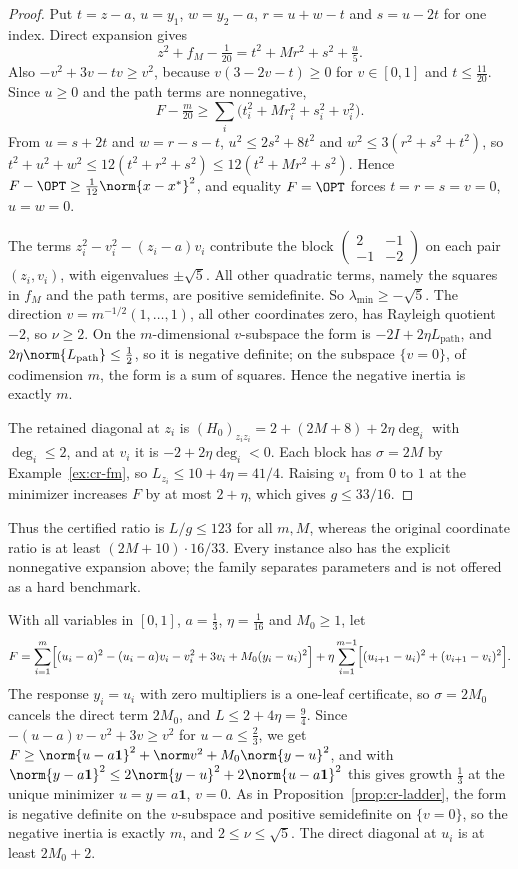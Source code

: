 \begin{proof}
Put $t=z-a$, $u=y_1$, $w=y_2-a$, $r=u+w-t$ and $s=u-2t$ for one index. Direct
expansion gives
\[
z^2+f_M-\tfrac1{20}=t^2+Mr^2+s^2+\tfrac u5.
\]
Also $-v^2+3v-tv\ge v^2$, because $v(3-2v-t)\ge0$ for $v\in[0,1]$ and
$t\le\frac{11}{20}$. Since $u\ge0$ and the path terms are nonnegative,
\[
F-\tfrac m{20}\ge\sum_i\bigl(t_i^2+Mr_i^2+s_i^2+v_i^2\bigr).
\]
From $u=s+2t$ and $w=r-s-t$, $u^2\le2s^2+8t^2$ and $w^2\le3(r^2+s^2+t^2)$, so
$t^2+u^2+w^2\le12(t^2+r^2+s^2)\le12(t^2+Mr^2+s^2)$. Hence
$F-\OPT\ge\frac1{12}\norm{x-x^*}^2$, and equality $F=\OPT$ forces
$t=r=s=v=0$, $u=w=0$.

The terms $z_i^2-v_i^2-(z_i-a)v_i$ contribute the block
$\left(\begin{smallmatrix}2&-1\\-1&-2\end{smallmatrix}\right)$ on each pair
$(z_i,v_i)$, with eigenvalues $\pm\sqrt5$. All other quadratic terms, namely
the squares in $f_M$ and the path terms, are positive semidefinite. So
$\lambda_{\min}\ge-\sqrt5$. The direction $v=m^{-1/2}(1,\ldots,1)$, all
other coordinates zero, has Rayleigh quotient $-2$, so $\nu\ge2$. On the
$m$-dimensional $v$-subspace the form is $-2I+2\eta L_{\mathrm{path}}$, and
$2\eta\norm{L_{\mathrm{path}}}\le\frac12$, so it is negative definite; on the
subspace $\{v=0\}$, of codimension $m$, the form is a sum of squares. Hence the
negative inertia is exactly $m$.

The retained diagonal at $z_i$ is
$(H_0)_{z_iz_i}=2+(2M+8)+2\eta\deg_i$ with $\deg_i\le2$, and at $v_i$ it is
$-2+2\eta\deg_i<0$. Each block has $\sigma=2M$ by Example~\ref{ex:cr-fm}, so
$L_{z_i}\le10+4\eta=41/4$. Raising $v_1$ from $0$ to $1$ at the minimizer
increases $F$ by at most $2+\eta$, which gives $g\le33/16$.
\end{proof}

Thus the certified ratio is $L/g\le123$ for all $m,M$, whereas the original
coordinate ratio is at least $(2M+10)\cdot16/33$. Every instance also has the
explicit nonnegative expansion above; the family separates parameters and is
not offered as a hard benchmark.

\begin{remark}\label{rem:cr-oneleaf}
With all variables in $[0,1]$, $a=\frac13$, $\eta=\frac1{16}$ and $M_0\ge1$, let
\[
F=\sum_{i=1}^m\Bigl[(u_i-a)^2-(u_i-a)v_i-v_i^2+3v_i+M_0(y_i-u_i)^2\Bigr]
+\eta\sum_{i=1}^{m-1}\Bigl[(u_{i+1}-u_i)^2+(v_{i+1}-v_i)^2\Bigr].
\]
The response $y_i=u_i$ with zero multipliers is a one-leaf certificate, so
$\sigma=2M_0$ cancels the direct term $2M_0$, and $L\le2+4\eta=\frac94$. Since
$-(u-a)v-v^2+3v\ge v^2$ for $u-a\le\frac23$, we get
$F\ge\norm{u-a\mathbf 1}^2+\norm v^2+M_0\norm{y-u}^2$, and with
$\norm{y-a\mathbf 1}^2\le2\norm{y-u}^2+2\norm{u-a\mathbf 1}^2$ this gives growth
$\frac13$ at the unique minimizer $u=y=a\mathbf 1$, $v=0$. As in
Proposition~\ref{prop:cr-ladder}, the form is negative definite on the
$v$-subspace and positive semidefinite on $\{v=0\}$, so the negative inertia is
exactly $m$, and $2\le\nu\le\sqrt5$. The direct diagonal at $u_i$ is at least
$2M_0+2$.
\end{remark}

